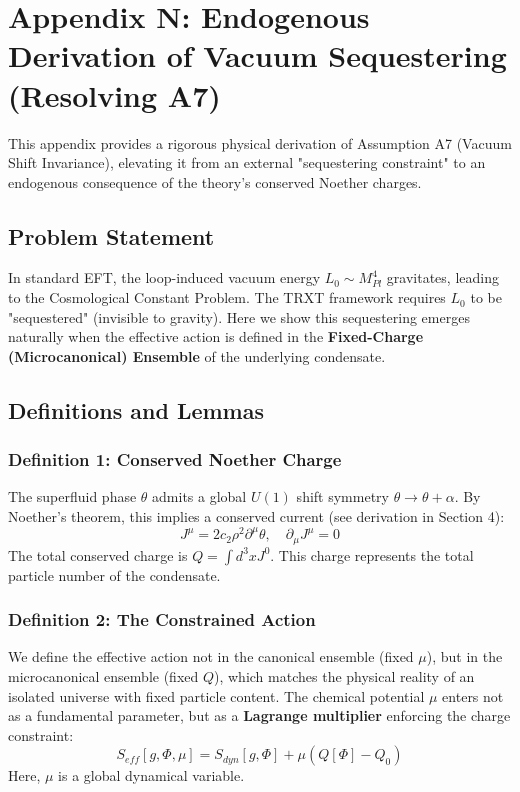 \section{Appendix N: Endogenous Derivation of Vacuum Sequestering (Resolving A7)}

This appendix provides a rigorous physical derivation of Assumption A7 (Vacuum Shift Invariance), elevating it from an external "sequestering constraint" to an endogenous consequence of the theory's conserved Noether charges.

\subsection{Problem Statement}
In standard EFT, the loop-induced vacuum energy $L_0 \sim M_{Pl}^4$ gravitates, leading to the Cosmological Constant Problem. The TRXT framework requires $L_0$ to be "sequestered" (invisible to gravity). Here we show this sequestering emerges naturally when the effective action is defined in the \textbf{Fixed-Charge (Microcanonical) Ensemble} of the underlying condensate.

\subsection{Definitions and Lemmas}

\subsubsection{Definition 1: Conserved Noether Charge}
The superfluid phase $\theta$ admits a global $U(1)$ shift symmetry $\theta \to \theta + \alpha$. By Noether's theorem, this implies a conserved current (see derivation in Section 4):
\begin{equation}
    J^\mu = 2c_2 \rho^2 \partial^\mu \theta, \quad \partial_\mu J^\mu = 0
\end{equation}
The total conserved charge is $Q = \int d^3x J^0$. This charge represents the total particle number of the condensate.

\subsubsection{Definition 2: The Constrained Action}
We define the effective action not in the canonical ensemble (fixed $\mu$), but in the microcanonical ensemble (fixed $Q$), which matches the physical reality of an isolated universe with fixed particle content. The chemical potential $\mu$ enters not as a fundamental parameter, but as a \textbf{Lagrange multiplier} enforcing the charge constraint:
\begin{equation}
    S_{eff}[g, \Phi, \mu] = S_{dyn}[g, \Phi] + \mu(Q[\Phi] - Q_0)
\end{equation}
Here, $\mu$ is a global dynamical variable.

